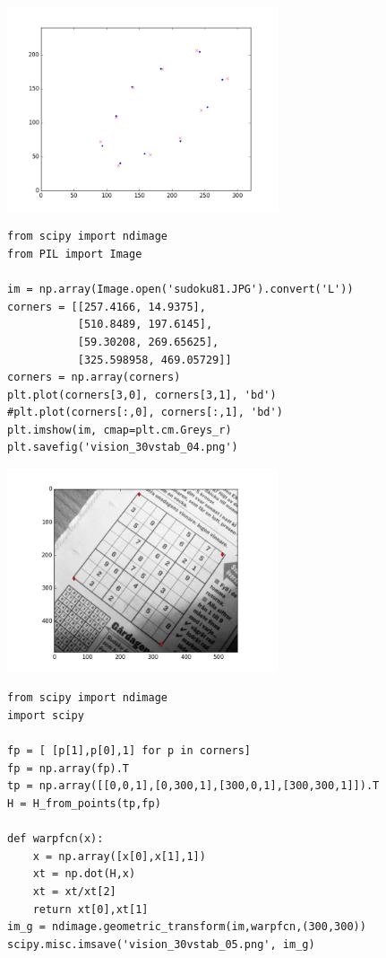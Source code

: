 \documentclass[12pt,fleqn]{article}\usepackage{../../common}
\begin{document}
\includegraphics[height=6cm]{vision_30vstab_03.png}


\begin{verbatim}
from scipy import ndimage
from PIL import Image

im = np.array(Image.open('sudoku81.JPG').convert('L'))
corners = [[257.4166, 14.9375], 
           [510.8489, 197.6145], 
           [59.30208, 269.65625], 
           [325.598958, 469.05729]]
corners = np.array(corners)
plt.plot(corners[3,0], corners[3,1], 'bd')
#plt.plot(corners[:,0], corners[:,1], 'bd')
plt.imshow(im, cmap=plt.cm.Greys_r)
plt.savefig('vision_30vstab_04.png')
\end{verbatim}

\includegraphics[height=6cm]{vision_30vstab_04.png}

\begin{verbatim}
from scipy import ndimage
import scipy

fp = [ [p[1],p[0],1] for p in corners]
fp = np.array(fp).T
tp = np.array([[0,0,1],[0,300,1],[300,0,1],[300,300,1]]).T
H = H_from_points(tp,fp)

def warpfcn(x):
    x = np.array([x[0],x[1],1])
    xt = np.dot(H,x)
    xt = xt/xt[2]
    return xt[0],xt[1]
im_g = ndimage.geometric_transform(im,warpfcn,(300,300))
scipy.misc.imsave('vision_30vstab_05.png', im_g)
\end{verbatim}
\end{document}
